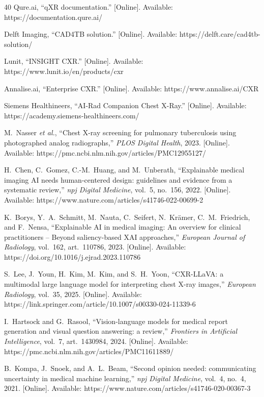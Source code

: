 \documentclass[conference, letterpaper]{IEEEtran}
\begin{document}
\begin{thebibliography}{40}
Qure.ai, ``qXR documentation.'' [Online]. Available: https://documentation.qure.ai/

Delft Imaging, ``CAD4TB solution.'' [Online]. Available: https://delft.care/cad4tb-solution/

Lunit, ``INSIGHT CXR.'' [Online]. Available: https://www.lunit.io/en/products/cxr

Annalise.ai, ``Enterprise CXR.'' [Online]. Available: https://www.annalise.ai/CXR

Siemens Healthineers, ``AI-Rad Companion Chest X-Ray.'' [Online]. Available: https://academy.siemens-healthineers.com/

M.~Nasser \textit{et al.}, ``Chest X-ray screening for pulmonary tuberculosis using photographed analog radiographs,'' \textit{PLOS Digital Health}, 2023. [Online]. Available: https://pmc.ncbi.nlm.nih.gov/articles/PMC12955127/

H.~Chen, C.~Gomez, C.-M.~Huang, and M.~Unberath, ``Explainable medical imaging AI needs human-centered design: guidelines and evidence from a systematic review,'' \textit{npj Digital Medicine}, vol.~5, no.~156, 2022. [Online]. Available: https://www.nature.com/articles/s41746-022-00699-2

K.~Borys, Y.~A.~Schmitt, M.~Nauta, C.~Seifert, N.~Kr\"{a}mer, C.~M.~Friedrich, and F.~Nensa, ``Explainable AI in medical imaging: An overview for clinical practitioners -- Beyond saliency-based XAI approaches,'' \textit{European Journal of Radiology}, vol.~162, art.~110786, 2023. [Online]. Available: https://doi.org/10.1016/j.ejrad.2023.110786

S.~Lee, J.~Youn, H.~Kim, M.~Kim, and S.~H.~Yoon, ``CXR-LLaVA: a multimodal large language model for interpreting chest X-ray images,'' \textit{European Radiology}, vol.~35, 2025. [Online]. Available: https://link.springer.com/article/10.1007/s00330-024-11339-6

I.~Hartsock and G.~Rasool, ``Vision-language models for medical report generation and visual question answering: a review,'' \textit{Frontiers in Artificial Intelligence}, vol.~7, art.~1430984, 2024. [Online]. Available: https://pmc.ncbi.nlm.nih.gov/articles/PMC11611889/

B.~Kompa, J.~Snoek, and A.~L.~Beam, ``Second opinion needed: communicating uncertainty in medical machine learning,'' \textit{npj Digital Medicine}, vol.~4, no.~4, 2021. [Online]. Available: https://www.nature.com/articles/s41746-020-00367-3


\end{thebibliography}
\end{document}
